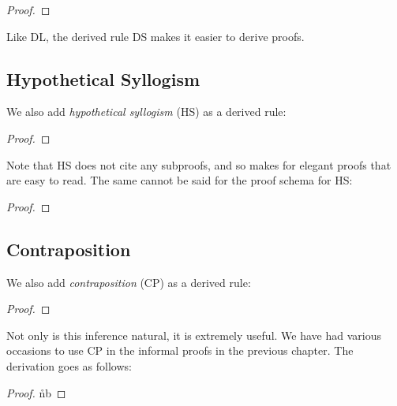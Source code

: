 \begin{proof}
	  
	 
	 
\end{proof}

Like DL, the derived rule DS makes it easier to derive proofs.




\subsection{Hypothetical Syllogism}

We also add \textit{hypothetical syllogism} (HS) as a derived rule:

\begin{proof}
\end{proof}

Note that HS does not cite any subproofs, and so makes for elegant proofs that are easy to read.
The same cannot be said for the proof schema for HS:

\begin{proof}
  \open 
     \as{}
     
     
  \close
   
\end{proof}


\subsection{Contraposition}

We also add \textit{contraposition} (CP) as a derived rule:

\begin{proof}
\end{proof}

Not only is this inference natural, it is extremely useful.
We have had various occasions to use CP in the informal proofs in the previous chapter.
The derivation goes as follows:

\begin{proof}
  \open 
     \as{}
    \open
     \as{}
     
     \r{nb}
    \close
   
  \close
   
\end{proof}

